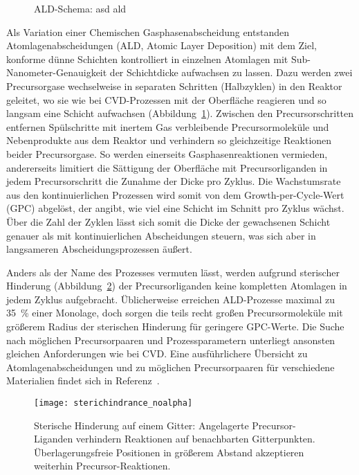 \begin{figure}
  \centering
  \def\svgwidth{\textwidth}
  
  \caption[ALD-Schema]{ALD-Schema: asd ald}
  \label{fig:ald-schema}
\end{figure}

Als Variation einer Chemischen Gasphasenabscheidung entstanden Atomlagenabscheidungen (ALD, Atomic Layer Deposition) mit dem Ziel, konforme dünne Schichten kontrolliert in einzelnen Atomlagen mit Sub-Nanometer-Genauigkeit der Schichtdicke aufwachsen zu lassen.
Dazu werden zwei Precursorgase wechselweise in separaten Schritten (Halbzyklen) in den Reaktor geleitet, wo sie wie bei CVD-Prozessen mit der Oberfläche reagieren und so langsam eine Schicht aufwachsen (Abbildung~\ref{fig:ald-schema}).
Zwischen den Precursorschritten entfernen Spülschritte mit inertem Gas verbleibende Precursormoleküle und Nebenprodukte aus dem Reaktor und verhindern so gleichzeitige Reaktionen beider Precursorgase.
So werden einerseits Gasphasenreaktionen vermieden, andererseits limitiert die Sättigung der Oberfläche mit Precursorliganden in jedem Precursorschritt die Zunahme der Dicke pro Zyklus.
Die Wachstumsrate aus den kontinuierlichen Prozessen wird somit von dem Growth-per-Cycle-Wert (GPC) abgelöst, der angibt, wie viel eine Schicht im Schnitt pro Zyklus wächst.
Über die Zahl der Zyklen lässt sich somit die Dicke der gewachsenen Schicht genauer als mit kontinuierlichen Abscheidungen steuern, was sich aber in langsameren Abscheidungsprozessen äußert.

Anders als der Name des Prozesses vermuten lässt, werden aufgrund sterischer Hinderung (Abbildung~\ref{fig:sterichindrance}) der Precursorliganden keine kompletten Atomlagen in jedem Zyklus aufgebracht.
Üblicherweise erreichen ALD-Prozesse maximal zu \SI{35}{\percent} einer Monolage, doch sorgen die teils recht großen Precursormoleküle mit größerem Radius der sterischen Hinderung für geringere GPC-Werte.
Die Suche nach möglichen Precursorpaaren und Prozessparametern unterliegt ansonsten gleichen Anforderungen wie bei CVD.
Eine ausführlichere Übersicht zu Atomlagenabscheidungen und zu möglichen Precursorpaaren für verschiedene Materialien findet sich in Referenz~\cite{puurunen_surface_2005}.

\begin{figure}
  \centering
  \texttt{[image: sterichindrance\_noalpha]}
  \caption[Sterische Hinderung]{Sterische Hinderung auf einem Gitter:
    Angelagerte Precursor-Liganden verhindern Reaktionen auf benachbarten Gitterpunkten.
    Überlagerungsfreie Positionen in größerem Abstand akzeptieren weiterhin Precursor-Reaktionen.
  }
  \label{fig:sterichindrance}
\end{figure}

